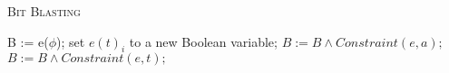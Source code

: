 \begin{algorithm}[t]
 \caption{\textsc{Bit Blasting}}
  \label{alg:bitblast}
 \begin{algorithmic}[1]
   \State B := e($\phi$);
   \State set $e(t)_i$ to a new Boolean variable;
   \EndFor
   \EndFor
   \State $B:=B \land Constraint(e, a);$
   \EndFor
   \State $B:=B \land Constraint(e,t);$ 
   \EndFor
   \State {}
 \end{algorithmic}
\end{algorithm}  

